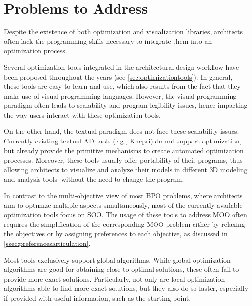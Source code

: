 	
	\section{Problems to Address}
	\label{sec:problemsaddress}
	
	Despite the existence of both optimization and visualization libraries, architects often lack the programming skills necessary to integrate them into an optimization process. 
	
	Several optimization tools integrated in the architectural design workflow have been proposed throughout the years (see \cref{sec:optimizationtools}). In general, these tools are easy to learn and use, which also results from the fact that they make use of visual programming languages. However, the visual programming paradigm often leads to scalability and program legibility issues, hence impacting the way users interact with these optimization tools. 
	
	On the other hand, the textual paradigm does not face these scalability issues. Currently existing textual \ac{AD} tools (e.g., Khepri) do not support optimization, but already provide the primitive mechanisms to create automated optimization processes. Moreover, these tools usually offer portability of their programs, thus allowing architects to visualize and analyze their models in different 3D modeling and analysis tools, without the need to change the program.
	
	In contrast to the multi-objective view of most \ac{BPO} problems, where architects aim to optimize multiple aspects simultaneously, most of the currently available optimization tools focus on \ac{SOO}. The usage of these tools to address \ac{MOO} often requires the simplification of the corresponding \ac{MOO} problem either by relaxing the objectives or by assigning preferences to each objective, as discussed in \cref{ssec:preferencesarticulation}.
	
	Most tools exclusively support global algorithms. While global optimization algorithms are good for obtaining close to optimal solutions, these often fail to provide more exact solutions. Particularly, not only are local optimization algorithms able to find more exact solutions, but they also do so faster, especially if provided with useful information, such as the starting point.
	

